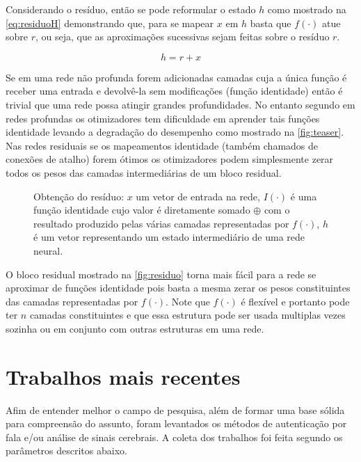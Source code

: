 				\par Considerando o resíduo, então se pode reformular o estado $h$ como mostrado na \autoref{eq:residuoH} demonstrando que, para se mapear $x$ em $h$ basta que $f(\cdot)$ atue sobre $r$, ou seja, que as aproximações sucessivas sejam feitas sobre o resíduo $r$.
				
				\begin{equation}
					\label{eq:residuoH}
					h = r + x
				\end{equation}
			
				\par Se em uma rede não profunda forem adicionadas camadas cuja a única função é receber uma entrada e devolvê-la sem modificações (função identidade) então é trivial que uma rede possa atingir grandes profundidades. No entanto segundo \cite{DBLP:journals/corr/HeZRS15} em redes profundas os otimizadores tem dificuldade em aprender tais funções identidade levando a degradação do desempenho como mostrado na \autoref{fig:teaser}. Nas redes residuais se os mapeamentos identidade (também chamados de conexões de atalho) forem ótimos os otimizadores podem simplesmente zerar todos os pesos das camadas intermediárias de um bloco residual.
				

				\begin{figure}[h]
					\centering
					\caption[Obtenção do resíduo]{Obtenção do resíduo: $x$ um vetor de entrada na rede, $I(\cdot)$ é uma função identidade cujo valor é diretamente somado $\oplus$ com o resultado produzido pelas várias camadas representadas por $f(\cdot)$, $h$ é um vetor representando um estado intermediário de uma rede neural.}
					
					\label{fig:residuo}
				\end{figure}
			
				\par O bloco residual mostrado na \autoref{fig:residuo} torna mais fácil para a rede se aproximar de funções identidade pois basta a mesma zerar os pesos constituintes das camadas representadas por $f(\cdot)$. Note que $f(\cdot)$ é flexível e portanto pode ter $n$ camadas constituintes e que essa estrutura pode ser usada multiplas vezes sozinha ou em conjunto com outras estruturas em uma rede.

	\section{Trabalhos mais recentes}
	
		\par Afim de entender melhor o campo de pesquisa, além de formar uma base sólida para compreensão do assunto, foram levantados os métodos de autenticação por fala e/ou análise de sinais cerebrais. A coleta dos trabalhos foi feita segundo os parâmetros descritos abaixo.
		
